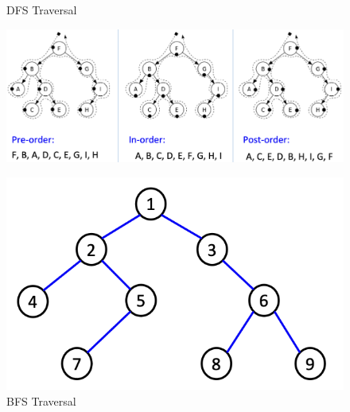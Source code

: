 \documentclass{article}
\begin{document}
\begin{description}
	\begin{figure}[H]
		\centering
		\caption{DFS Traversal}
		\includegraphics[scale=0.4]{dfs} \\
		\vspace{0.5cm}
		\caption{BFS Traversal}
		\includegraphics[scale=0.6]{bfs}
	\end{figure}
	

\end{description}
\end{document}

